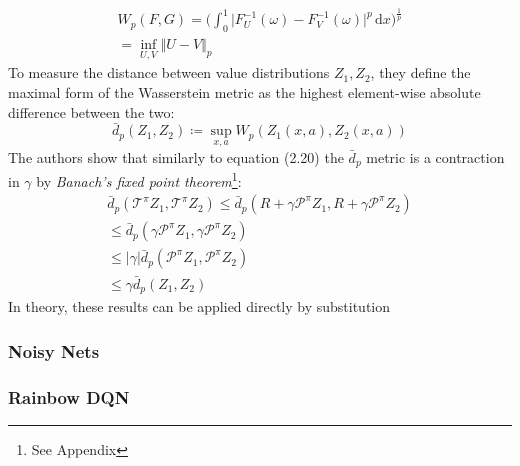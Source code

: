 \begin{equation}
    \begin{gathered}
        W_p(F,G) = \biggl ( \int_{0}^{1} \vert F^{-1}_U(\omega) - F^{-1}_{V}(\omega) \vert^p \,\mathrm{d}x \biggl )^{\frac{1}{p}} \\
        = \inf_{U,V} \Vert U - V \Vert_p
    \end{gathered}
\end{equation}
To measure the distance between value distributions $Z_1, Z_2$, they define the maximal form of the Wasserstein metric
as the highest element-wise absolute difference between the two:
\begin{equation}
    \bar{d}_p(Z_1, Z_2) \coloneqq \sup_{x,a} W_p(Z_1(x,a), Z_2(x,a)) 
\end{equation}
The authors show that similarly to equation (2.20) the $\bar{d}_p$ metric is a contraction in $\gamma$
by \emph{Banach's fixed point theorem}\footnote{See Appendix}:
\begin{equation}
    \begin{gathered}
        \bar{d}_p( \mathcal{T}^\pi Z_1, \mathcal{T}^\pi Z_2) \leqslant \bar{d}_p(R + \gamma \mathcal{P}^\pi Z_1, R + \gamma \mathcal{P}^\pi Z_2) \\
        \leqslant \bar{d}_p(\gamma \mathcal{P}^\pi Z_1, \gamma \mathcal{P}^\pi Z_2) \\
        \leqslant \vert \gamma \vert \bar{d}_p(\mathcal{P}^\pi Z_1, \mathcal{P}^\pi Z_2) \\
        \leqslant \gamma \bar{d}_p(Z_1, Z_2) 
    \end{gathered}
\end{equation}
In theory, these results can be applied directly by substitution
\subsubsection{Noisy Nets}
\subsubsection{Rainbow DQN}